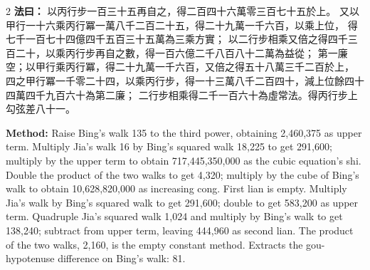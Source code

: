 \documentclass[11pt,a4paper]{article}
\newcommand{\fayue}[1]{%
  \noindent\textcolor{methodcolor}{\textbf{法曰：}}{\tradfont #1}\par\nopagebreak%
}
\newcommand{\fayueeng}[1]{%
  \noindent\textcolor{engcolor}{\textbf{Method: }}{#1}\par\nopagebreak%
}
\begin{document}
\vspace{0.3em}

\begin{paracol}{2}
\fayue{%
以丙行步一百三十五再自之，得二百四十六萬零三百七十五於上。
又以甲行一十六乘丙行冪一萬八千二百二十五，得二十九萬一千六百，以乘上位，
得七千一百七十四億四千五百三十五萬為三乘方實；
以二行步相乘又倍之得四千三百二十，以乘丙行步再自之數，得一百六億二千八百八十二萬為益從；
第一廉空；以甲行乘丙行冪，得二十九萬一千六百，又倍之得五十八萬三千二百於上，
四之甲行冪一千零二十四，以乘丙行步，得一十三萬八千二百四十，減上位餘四十四萬四千九百六十為第二廉；
二行步相乘得二千一百六十為虛常法。得丙行步上勾弦差八十一。}
\switchcolumn
\fayueeng{%
Raise Bing's walk 135 to the third power, obtaining 2,460,375 as upper term. Multiply Jia's walk 16 by Bing's squared walk 18,225 to get 291,600; multiply by the upper term to obtain 717,445,350,000 as the cubic equation's shi. Double the product of the two walks to get 4,320; multiply by the cube of Bing's walk to obtain 10,628,820,000 as increasing cong. First lian is empty. Multiply Jia's walk by Bing's squared walk to get 291,600; double to get 583,200 as upper term. Quadruple Jia's squared walk 1,024 and multiply by Bing's walk to get 138,240; subtract from upper term, leaving 444,960 as second lian. The product of the two walks, 2,160, is the empty constant method. Extracts the gou-hypotenuse difference on Bing's walk: 81.}
\end{paracol}
\end{document}
